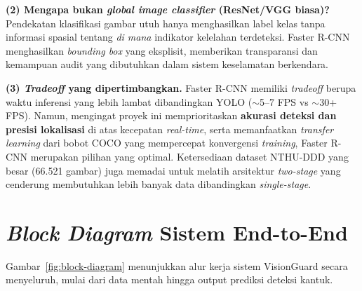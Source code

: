 \documentclass[11pt,a4paper,oneside]{report}
\begin{document}
\textbf{(2) Mengapa bukan \textit{global image classifier} (ResNet/VGG biasa)?}
Pendekatan klasifikasi gambar utuh hanya menghasilkan label kelas tanpa informasi spasial tentang \textit{di mana} indikator kelelahan terdeteksi. Faster R-CNN menghasilkan \textit{bounding box} yang eksplisit, memberikan transparansi dan kemampuan audit yang dibutuhkan dalam sistem keselamatan berkendara.

\textbf{(3) \textit{Tradeoff} yang dipertimbangkan.}
Faster R-CNN memiliki \textit{tradeoff} berupa waktu inferensi yang lebih lambat dibandingkan YOLO ($\sim$5--7 FPS vs $\sim$30+ FPS). Namun, mengingat proyek ini memprioritaskan \textbf{akurasi deteksi dan presisi lokalisasi} di atas kecepatan \textit{real-time}, serta memanfaatkan \textit{transfer learning} dari bobot COCO yang mempercepat konvergensi \textit{training}, Faster R-CNN merupakan pilihan yang optimal. Ketersediaan dataset NTHU-DDD yang besar (66.521 gambar) juga memadai untuk melatih arsitektur \textit{two-stage} yang cenderung membutuhkan lebih banyak data dibandingkan \textit{single-stage}.

\section{\textit{Block Diagram} Sistem End-to-End}

Gambar~\ref{fig:block-diagram} menunjukkan alur kerja sistem VisionGuard secara menyeluruh, mulai dari data mentah hingga output prediksi deteksi kantuk.
\end{document}
